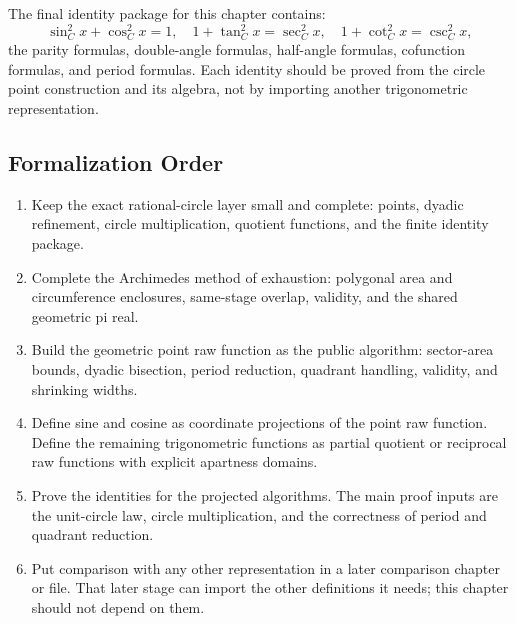 \begin{theorem}
\label{thm:geometric-trig-identities}
The final identity package for this chapter contains:
\[
  \sin_C^2 x+\cos_C^2 x=1,\quad
  1+\tan_C^2 x=\sec_C^2 x,\quad
  1+\cot_C^2 x=\csc_C^2 x,
\]
the parity formulas, double-angle formulas, half-angle formulas, cofunction
formulas, and period formulas.  Each identity should be proved from the
circle point construction and its algebra, not by importing another
trigonometric representation.
\end{theorem}

\subsection{Formalization Order}

\begin{enumerate}
  \item Keep the exact rational-circle layer small and complete: points,
  dyadic refinement, circle multiplication, quotient functions, and the
  finite identity package.

  \item Complete the Archimedes method of exhaustion: polygonal area and
  circumference enclosures, same-stage overlap, validity, and the shared
  geometric pi real.

  \item Build the geometric point raw function as the public algorithm:
  sector-area bounds, dyadic bisection, period reduction, quadrant handling,
  validity, and shrinking widths.

  \item Define sine and cosine as coordinate projections of the point raw
  function.  Define the remaining trigonometric functions as partial
  quotient or reciprocal raw functions with explicit apartness domains.

  \item Prove the identities for the projected algorithms.  The main proof
  inputs are the unit-circle law, circle multiplication, and the correctness
  of period and quadrant reduction.

  \item Put comparison with any other representation in a later comparison
  chapter or file.  That later stage can import the other definitions it
  needs; this chapter should not depend on them.
\end{enumerate}
